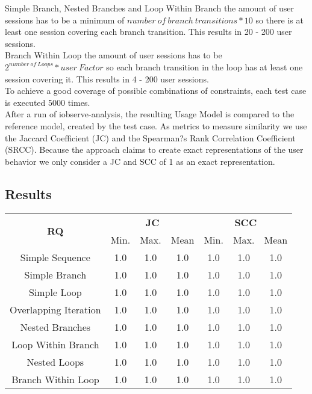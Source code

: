 \documentclass[10pt,a4paper]{article}
\begin{document}
	Simple Branch, Nested Branches and Loop Within Branch the amount of user sessions has to be a minimum of $number\ of\ branch\ transitions * 10$ so there is at least one session covering each branch transition. This results in 20 - 200 user sessions.\\
	Branch Within Loop the amount of user sessions has to be $2^{number\ of\ Loops} * user\ Factor$ so each branch transition in the loop has at least one session covering it. This results in 4 - 200 user sessions.\\
	To achieve a good coverage of possible combinations of constraints, each test case is executed 5000 times.\\
	After a run of iobserve-analysis, the resulting Usage Model is compared to the reference model, created by the test case. As metrics to measure similarity we use the Jaccard Coefficient (JC) and the Spearman?s Rank Correlation Coefficient (SRCC). Because the approach claims to create exact representations of the user behavior we only consider a JC and SCC of 1 as an exact representation.
	\subsection{Results}
	\begin{table}[H]
		\centering
		\begin{tabular}{|c||c|c|c||c|c|c|}
			\hline
			\multirow{2}{*}{\textbf{RQ}}
			 & \multicolumn{3}{c||}{\textbf{JC}} & \multicolumn{3}{c|}{\textbf{SCC}} \\
			 \cline{2-7}
			 & Min. & Max. & Mean & Min. & Max. & Mean \\
			\hhline{|=======|}
			Simple Sequence & 1.0 & 1.0 & 1.0 & 1.0 & 1.0 & 1.0 \\
			\hline
			Simple Branch & 1.0 & 1.0 & 1.0 & 1.0 & 1.0 & 1.0 \\
			\hline
			Simple Loop & 1.0 & 1.0 & 1.0 & 1.0 & 1.0 & 1.0 \\
			\hline
			Overlapping Iteration & 1.0 & 1.0 & 1.0 & 1.0 & 1.0 & 1.0 \\
			\hline
			Nested Branches & 1.0 & 1.0 & 1.0 & 1.0 & 1.0 & 1.0 \\
			\hline
			Loop Within Branch & 1.0 & 1.0 & 1.0 & 1.0 & 1.0 & 1.0 \\
			\hline
			Nested Loops & 1.0 & 1.0 & 1.0 & 1.0 & 1.0 & 1.0 \\
			\hline
			Branch Within Loop & 1.0 & 1.0 & 1.0 & 1.0 & 1.0 & 1.0 \\
			\hline
		\end{tabular}
	\end{table}
\end{document}
